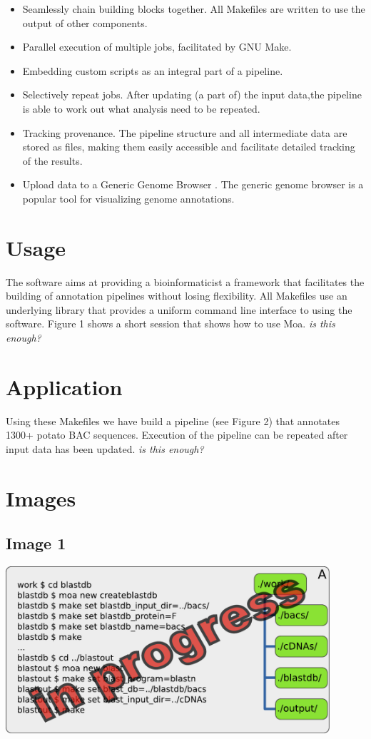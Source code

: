 \documentclass[a4paper,11pt,oneside]{article}
\begin{document}
\begin{itemize}
\item Seamlessly chain building blocks together. All Makefiles are
  written to use the output of other components.
\item Parallel execution of multiple jobs, facilitated by GNU Make.
\item Embedding custom scripts as an integral part of a pipeline.
\item Selectively repeat jobs. After updating (a part of) the input
  data,the pipeline is able to work out what analysis need to be
  repeated.
\item Tracking provenance. The pipeline structure and all intermediate
  data are stored as files, making them easily accessible and
  facilitate detailed tracking of the results.
\item Upload data to a Generic Genome Browser \citep{Stein2002}. The
  generic genome browser is a popular tool for visualizing genome
  annotations.
\end{itemize}

\section{Usage}

The software aims at providing a bioinformaticist a framework that
facilitates the building of annotation pipelines without losing
flexibility. All Makefiles use an underlying library that provides a
uniform command line interface to using the software. Figure 1 shows a
short session that shows how to use Moa. \textit{is this enough?}

\section{Application}

Using these Makefiles we have build a pipeline (see Figure 2) that
annotates 1300+ potato BAC sequences. Execution of the pipeline can be
repeated after input data has been updated. \textit{is this enough?}

\section{Images}

\subsection{Image 1}
\includegraphics[width=0.9\textwidth]{image1_session.pdf}
\end{document}
